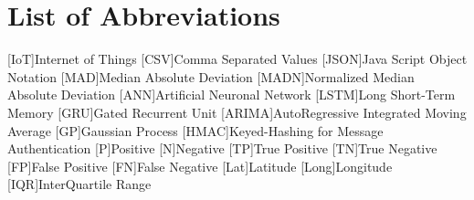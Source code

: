 \newpage





\newpage
\listoffigures


\newpage
\listoftables
\clearpage

\renewcommand\listoflistingscaption{List of source codes}
\listoflistings
\clearpage


{}
\chapter*{List of Abbreviations}
\begin{acronym}%
	[IoT]{Internet of Things}
	[CSV]{Comma Separated Values }
	[JSON]{Java Script Object Notation}
	[MAD]{Median Absolute Deviation}
	[MADN]{Normalized Median Absolute Deviation}
	[ANN]{Artificial Neuronal Network}
	[LSTM]{Long Short-Term Memory}
	[GRU]{Gated Recurrent Unit}
	[ARIMA]{AutoRegressive Integrated Moving Average}
	[GP]{Gaussian Process}
	[HMAC]{Keyed-Hashing for Message Authentication}
	{Positive}
	{Negative}
	[TP]{True Positive}
	[TN]{True Negative}
	[FP]{False Positive}
	[FN]{False Negative}
	[Lat]{Latitude}
	[Long]{Longitude}
	[IQR]{InterQuartile Range}
\end{acronym}
